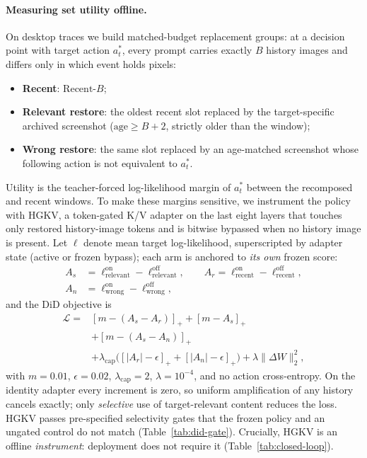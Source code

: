 \documentclass[letterpaper]{article} %
\newcommand{\hgkv}{\textsc{HGKV}}
\begin{document}
\paragraph{Measuring set utility offline.}
On desktop traces we build matched-budget replacement groups: at a
decision point with target action $a^*_t$, every prompt carries exactly
$B$ history images and differs only in which event holds pixels:
\begin{itemize}
    \item \textbf{Recent}: $\mathrm{Recent}\text{-}B$;
    \item \textbf{Relevant restore}: the oldest recent slot replaced by
    the target-specific archived screenshot
    ($\mathrm{age}\geq B{+}2$, strictly older than the window);
    \item \textbf{Wrong restore}: the same slot replaced by an
    age-matched screenshot whose following action is not equivalent to
    $a^*_t$.
\end{itemize} Utility is the teacher-forced log-likelihood margin of $a^*_t$
between the recomposed and recent windows. To make these margins
sensitive, we instrument the policy with \hgkv{}, a token-gated K/V
adapter on the last eight layers that touches only restored history-image
tokens and is bitwise bypassed when no history image is present. Let
$\ell$ denote mean target log-likelihood, superscripted by adapter state
(active or frozen bypass); each arm is anchored to \emph{its own} frozen
score:
\begin{equation}
\begin{aligned}
A_s&=\ell^{\mathrm{on}}_{\mathrm{relevant}}-\ell^{\mathrm{off}}_{\mathrm{relevant}},\qquad
A_r=\ell^{\mathrm{on}}_{\mathrm{recent}}-\ell^{\mathrm{off}}_{\mathrm{recent}},\\
A_n&=\ell^{\mathrm{on}}_{\mathrm{wrong}}-\ell^{\mathrm{off}}_{\mathrm{wrong}},
\end{aligned}
\end{equation}
and the DiD objective is
\begin{equation}
\begin{aligned}
\mathcal L ={}& [m-(A_s-A_r)]_+ + [m-A_s]_+ \\
&+ [m-(A_s-A_n)]_+ \\
&+ \lambda_{\mathrm{cap}}\bigl([|A_r|-\epsilon]_+ + [|A_n|-\epsilon]_+\bigr)
+ \lambda\lVert\Delta W\rVert_2^2,
\end{aligned}
\label{eq:did}
\end{equation}
with $m{=}0.01$, $\epsilon{=}0.02$, $\lambda_{\mathrm{cap}}{=}2$,
$\lambda{=}10^{-4}$, and no action cross-entropy. On the identity adapter
every increment is zero, so uniform amplification of any history cancels
exactly; only \emph{selective} use of target-relevant content reduces the
loss. \hgkv{} passes pre-specified
selectivity gates that the frozen policy and an ungated control do not
match (Table~\ref{tab:did-gate}). Crucially, \hgkv{} is an offline
\emph{instrument}: deployment does not require it
(Table~\ref{tab:closed-loop}).
\end{document}
